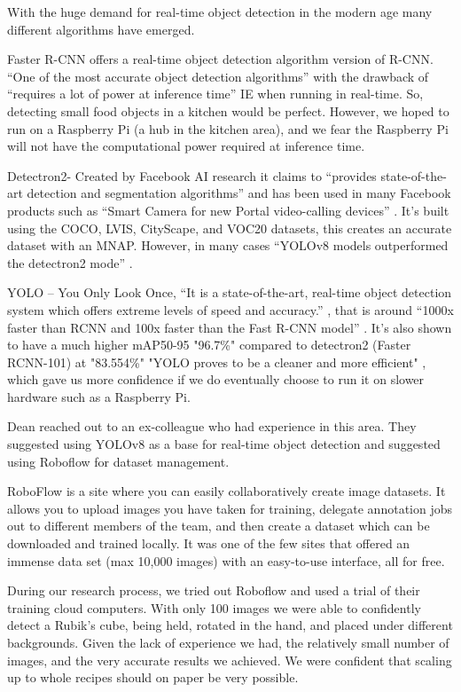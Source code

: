 \documentclass{article}
\begin{document}
With the huge demand for real-time object detection in the modern age many different algorithms have emerged.

Faster R-CNN offers a real-time object detection algorithm version of R-CNN. “One of the most accurate object detection algorithms” \cite{FasterRCNN} with the drawback of “requires a lot of power at inference time” IE when running in real-time. So, detecting small food objects in a kitchen would be perfect. However, we hoped to run on a Raspberry Pi (a hub in the kitchen area), and we fear the Raspberry Pi will not have the computational power required \cite{Fast-CNN-Rasberry-Pi} at inference time.

Detectron2- Created by Facebook AI research it claims to “provides state-of-the-art detection and segmentation algorithms” \cite{wu2019detectron2} and has been used in many Facebook products such as “Smart Camera for new Portal video-calling devices” \cite{metasmartcameras}. It’s built using the COCO, LVIS, CityScape, and VOC20 datasets, this creates an accurate dataset with an MNAP. However, in many cases “YOLOv8 models outperformed the detectron2 mode” \cite{ai5010005}.

YOLO – You Only Look Once, “It is a state-of-the-art, real-time object detection system which offers extreme levels of speed and accuracy.” \cite{rajeshwari2019object}, that is around “1000x faster than RCNN and 100x faster than the Fast R-CNN model” \cite{rajeshwari2019object}.  It's also shown to have a much higher mAP50-95 "96.7\%" compared to detectron2 (Faster RCNN-101) at "83.554\%"  "YOLO proves to be a cleaner and more efficient" \cite{joiya2022object}, which gave us more confidence if we do eventually choose to run it on slower hardware such as a Raspberry Pi.

Dean reached out to an ex-colleague who had experience in this area. They suggested using YOLOv8 \cite{Jocher_Ultralytics_YOLO_2023} as a base for real-time object detection and suggested using Roboflow \cite{RoboFlow-Software} for dataset management. 

RoboFlow \cite{RoboFlow-Software} is a site where you can easily collaboratively create image datasets. It allows you to upload images you have taken for training, delegate annotation jobs out to different members of the team, and then create a dataset which can be downloaded and trained locally. It was one of the few sites that offered an immense data set (max 10,000 images) with an easy-to-use interface, all for free.

During our research process, we tried out Roboflow and used a trial of their training cloud computers. With only 100 images we were able to confidently detect a Rubik's cube, being held, rotated in the hand, and placed under different backgrounds. Given the lack of experience we had, the relatively small number of images, and the very accurate results we achieved. We were confident that scaling up to whole recipes should on paper be very possible.
\end{document}
